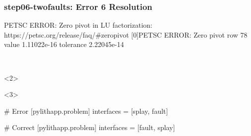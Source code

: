 \documentclass[aspectratio=169]{beamer}
\begin{document}
\begin{frame}[t,fragile]
  \frametitle{{\ttfamily step06-twofaults}: Error 6 Resolution}

  \tserror
  \begin{bashcode}
[0]PETSC ERROR: Zero pivot in LU factorization: https://petsc.org/release/faq/#zeropivot
[0]PETSC ERROR: Zero pivot row 78 value 1.11022e-16 tolerance 2.22045e-14
  \end{bashcode}

  \pause\\[1pt]

  \begin{onlyenv}<2>
  \end{onlyenv}
  \begin{onlyenv}<3>
  \begin{cfgcode}
    # Error
    [pylithapp.problem]
    interfaces = [splay, fault]

    # Correct
    [pylithapp.problem]
    interfaces = [fault, splay]
  \end{cfgcode}
  \end{onlyenv}

\end{frame}
\end{document}
